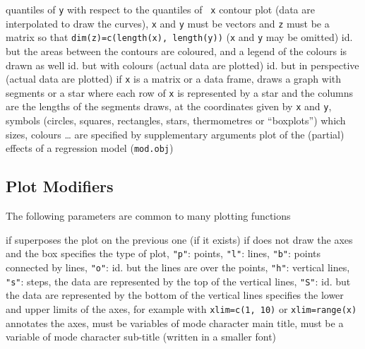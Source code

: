 	{quantiles of {\tt y} with respect to the quantiles of {\tt
x}}
	{contour plot (data are interpolated to draw the
curves), {\tt x} and {\tt y} must be vectors and {\tt z} must be a matrix so
that {\tt dim(z)=c(length(x), length(y))} ({\tt x} and {\tt y} may be omitted)}
	{ id. but the areas between the contours are
coloured, and a legend of the colours is drawn as well}
	{ id. but with colours (actual data are plotted)}
	{ id. but in perspective (actual data are plotted)}
	{if {\tt x} is a matrix or a data frame, draws a graph with
segments or a star where each row of {\tt x} is represented by a star and the
columns are the lengths of the segments}
	{draws, at the coordinates given by {\tt x} and
{\tt y}, symbols (circles, squares, rectangles, stars, thermometres or
``boxplots'') which sizes, colours \ldots{} are specified by supplementary
arguments}
	{ plot of the (partial) effects of a regression
model ({\tt mod.obj})}

\subsection{Plot Modifiers}{The following parameters are common to many
    plotting functions}

	{if \T superposes the plot on the previous one (if it exists)}
	{if \F does not draw the axes and the box}
	{ specifies the type of plot, {\tt "p"}: points, {\tt "l"}:
lines, {\tt "b"}: points connected by lines, {\tt "o"}: id. but the lines are
over the points, {\tt "h"}: vertical lines, {\tt "s"}: steps, the data are
represented by the top of the vertical lines, {\tt "S"}: id. but the data are
represented by the bottom of the vertical lines}
	{specifies the lower and upper limits of the axes, for
example with {\tt xlim=c(1, 10)} or {\tt xlim=range(x)}}
	{ annotates the axes, must be variables of mode character}
	{ main title, must be a variable of mode character}
	{ sub-title (written in a smaller font)}

